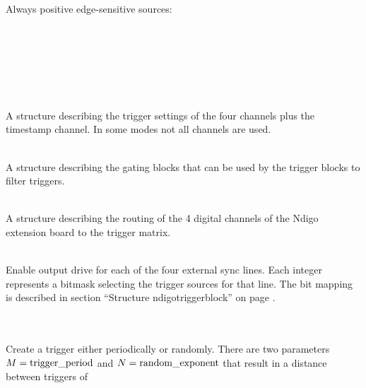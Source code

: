 			\\
			\par
			
			Always positive edge-sensitive sources:\\
			\\
			\\
			\\
			\\
			\\
			\par

			\\
			A structure describing the trigger settings of the four channels plus the timestamp channel. In some modes not all channels are used.\par

			\\
			A structure describing the gating blocks that can be used by the trigger blocks to filter triggers.\par

			\\
			A structure describing the routing of the 4 digital channels of the Ndigo extension board to the trigger matrix.\par

			\\
			Enable output drive for each of the four external sync lines. Each integer represents a bitmask selecting the trigger sources for that line. The bit mapping is described in section ``Structure \textsf{ndigo\tu trigger\tu block}'' on page \pageref{cp:triggerblock}.\par

			\\
			\\
			Create a trigger either periodically or randomly. There are two parameters $M = \text{trigger\textunderscore period}$ and $N = \text{random\textunderscore exponent}$ that result in a distance between triggers of
			
